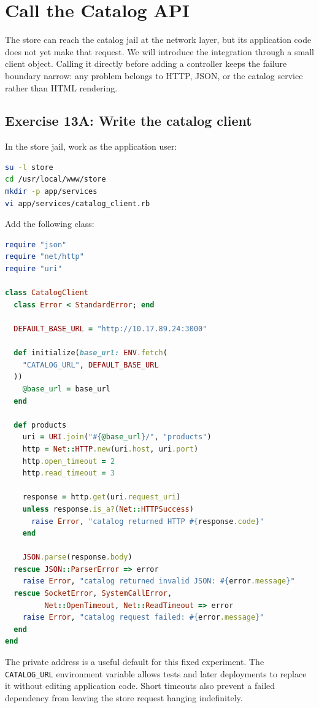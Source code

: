 \chapter{Call the Catalog API}

The store can reach the catalog jail at the network layer, but its application
code does not yet make that request. We will introduce the integration through
a small client object. Calling it directly before adding a controller keeps
the failure boundary narrow: any problem belongs to HTTP, JSON, or the catalog
service rather than HTML rendering.

\section{Exercise 13A: Write the catalog client}

In the store jail, work as the application user:

\begin{lstlisting}[language=sh]
su -l store
cd /usr/local/www/store
mkdir -p app/services
vi app/services/catalog_client.rb
\end{lstlisting}

Add the following class:

\begin{lstlisting}[language=Ruby]
require "json"
require "net/http"
require "uri"

class CatalogClient
  class Error < StandardError; end

  DEFAULT_BASE_URL = "http://10.17.89.24:3000"

  def initialize(base_url: ENV.fetch(
    "CATALOG_URL", DEFAULT_BASE_URL
  ))
    @base_url = base_url
  end

  def products
    uri = URI.join("#{@base_url}/", "products")
    http = Net::HTTP.new(uri.host, uri.port)
    http.open_timeout = 2
    http.read_timeout = 3

    response = http.get(uri.request_uri)
    unless response.is_a?(Net::HTTPSuccess)
      raise Error, "catalog returned HTTP #{response.code}"
    end

    JSON.parse(response.body)
  rescue JSON::ParserError => error
    raise Error, "catalog returned invalid JSON: #{error.message}"
  rescue SocketError, SystemCallError,
         Net::OpenTimeout, Net::ReadTimeout => error
    raise Error, "catalog request failed: #{error.message}"
  end
end
\end{lstlisting}

The private address is a useful default for this fixed experiment. The
\texttt{CATALOG\_URL} environment variable allows tests and later deployments
to replace it without editing application code. Short timeouts also prevent a
failed dependency from leaving the store request hanging indefinitely.


